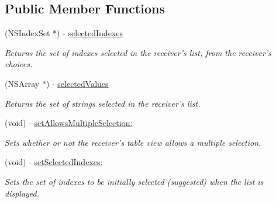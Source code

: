\subsection*{Public Member Functions}
\begin{CompactItemize}
\item 
\hypertarget{interface_s_s_y_labelled_list_f55eba1cf5bd693dc76dd8fdb8c4e092}{
(NSIndexSet $\ast$) - \hyperlink{interface_s_s_y_labelled_list_f55eba1cf5bd693dc76dd8fdb8c4e092}{selectedIndexes}}
\label{interface_s_s_y_labelled_list_f55eba1cf5bd693dc76dd8fdb8c4e092}

\begin{CompactList}\small\item\em Returns the set of indexes selected in the receiver's list, from the receiver's choices. \item\end{CompactList}\item 
\hypertarget{interface_s_s_y_labelled_list_252f3b62f2a9f8fd5ddcfb728076a6d3}{
(NSArray $\ast$) - \hyperlink{interface_s_s_y_labelled_list_252f3b62f2a9f8fd5ddcfb728076a6d3}{selectedValues}}
\label{interface_s_s_y_labelled_list_252f3b62f2a9f8fd5ddcfb728076a6d3}

\begin{CompactList}\small\item\em Returns the set of strings selected in the receiver's list. \item\end{CompactList}\item 
(void) - \hyperlink{interface_s_s_y_labelled_list_db8c7701fa1bab293368423691e60a61}{setAllowsMultipleSelection:}
\begin{CompactList}\small\item\em Sets whether or not the receiver's table view allows a multiple selection. \item\end{CompactList}\item 
\hypertarget{interface_s_s_y_labelled_list_aee783c884612f2d46e67d15fba43f42}{
(void) - \hyperlink{interface_s_s_y_labelled_list_aee783c884612f2d46e67d15fba43f42}{setSelectedIndexes:}}
\label{interface_s_s_y_labelled_list_aee783c884612f2d46e67d15fba43f42}

\begin{CompactList}\small\item\em Sets the set of indexes to be initially selected (suggested) when the list is displayed. \item\end{CompactList}\end{CompactItemize}
